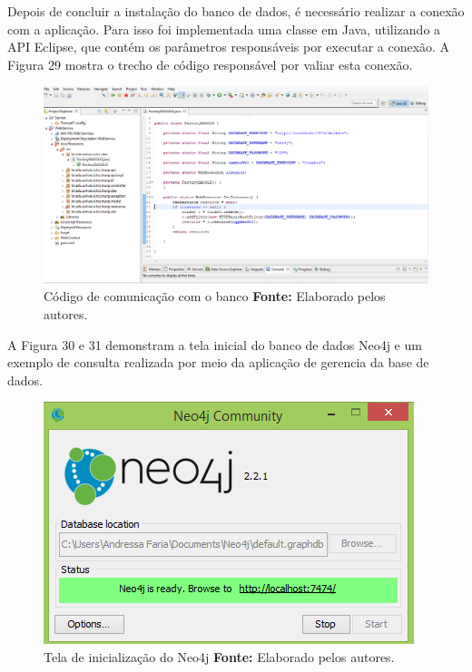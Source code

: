 \par Depois de concluir a instalação do banco de dados, é necessário realizar a conexão com a aplicação. Para isso foi implementada uma classe em Java, utilizando a API Eclipse, que contém os parâmetros responsáveis por executar a conexão. A Figura 29 mostra o trecho de código responsável por valiar esta conexão.


\begin{figure}[h!]
	\centerline{\includegraphics[scale=0.35]{./imagens/conexao-banco.jpg}}
	\caption[Código de comunicação com o banco]
	{Código de comunicação com o banco \textbf{Fonte:} Elaborado pelos autores.}
	\label{fig:exemplo1}
\end{figure}


\par A Figura 30 e 31 demonstram a tela inicial do banco de dados Neo4j e um exemplo de consulta realizada por meio da aplicação de gerencia da base de dados.

\begin{figure}[h!]
	\centerline{\includegraphics[scale=0.60]{./imagens/neo4j.jpg}}
	\caption[Tela de inicialização do Neo4j ]
	{Tela de inicialização do Neo4j \textbf{Fonte:} Elaborado pelos autores.}
	\label{fig:exemplo1}
\end{figure}

